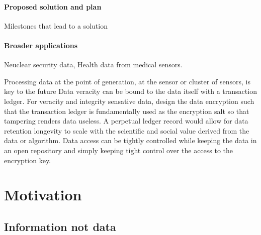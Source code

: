 \documentclass{article}
\begin{document}
\paragraph{Proposed solution and plan}
Milestones that lead to a solution
\paragraph{Broader applications}
Neuclear security data, Health data from medical sensors.

Processing data at the point of generation, at the sensor or cluster of sensors, is key to the future \cite{Gartner2018,NetworkWorld2019}
Data veracity can be bound to the data itself with a transaction ledger.
For veracity and integrity sensative data, design the data encryption such that the transaction ledger is fundamentally used as the encryption salt so that tampering renders data useless.
A perpetual ledger record would allow for data retention longevity to scale with the scientific and social value derived from the data or algorithm.
Data access can be tightly controlled while keeping the data in an open repository and simply keeping tight control over the access to the encryption key.

\break

\section{Motivation}

\subsection{Information not data}
\end{document}
